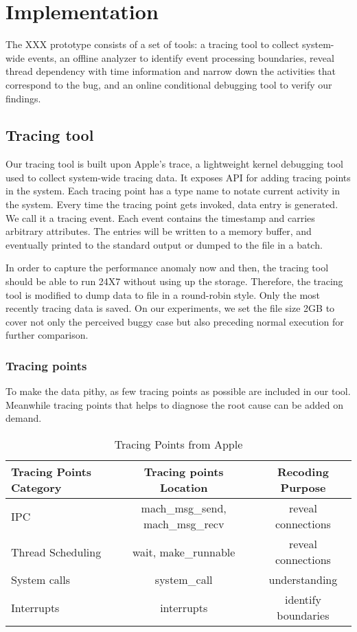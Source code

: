\section{Implementation}
The XXX prototype consists of a set of tools: a tracing tool to collect system-wide events, an offline analyzer to identify event processing boundaries, reveal thread dependency with time information and narrow down the activities that correspond to the bug, and an online conditional debugging tool to verify our findings.
\par
\subsection{Tracing tool}
Our tracing tool is built upon Apple's trace, a lightweight kernel debugging tool used to collect system-wide tracing data.
It exposes API for adding tracing points in the system.
Each tracing point has a type name to notate current activity in the system.
Every time the tracing point gets invoked, data entry is generated.
We call it a tracing event.
Each event contains the timestamp and carries arbitrary attributes.
The entries will be written to a memory buffer, and eventually printed to the standard output or dumped to the file in a batch.\par
In order to capture the performance anomaly now and then, the tracing tool should be able to run 24X7 without using up the storage.
Therefore, the tracing tool is modified to dump data to file in a round-robin style.
Only the most recently tracing data is saved.
On our experiments, we set the file size 2GB to cover not only the perceived buggy case but also preceding normal execution for further comparison.\par
\subsubsection{Tracing points}
To make the data pithy, as few tracing points as possible are included in our tool.
Meanwhile tracing points that helps to diagnose the root cause can be added on demand.
\begin{table}[h]
\begin{adjustbox}{width=\columnwidth, center}
\begin{tabular}{|l|c|c|}
\hline
Tracing Points Category & Tracing points Location & Recoding Purpose\\
\hline
\hline
IPC & mach\_msg\_send, mach\_msg\_recv & reveal connections\\
\hline
Thread Scheduling & wait, make\_runnable & reveal connections\\
\hline
System calls & system\_call & understanding\\
\hline
Interrupts & interrupts & identify boundaries\\
\hline
\end{tabular}
\end{adjustbox}
\caption{Tracing Points from Apple}
\label{tab:Tracing Points from Apple}
\end{table}

